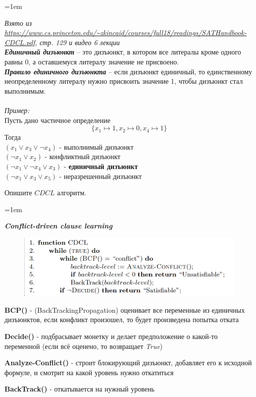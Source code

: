 \documentclass[12pt]{extreport}
\theoremstyle{definiton}
\theoremstyle{definition}
\theoremstyle{definition}
\newcommand{\solution}[2][\color{myblue}Ответ]{
\medskip
	\noindent{\bfseries #1 }{{\color{myblue}\bfseries #2:}}
}
\newenvironment{blockquote}{%
  \par%
  \medskip
  \leftskip=1em%
  \noindent}{%
  \par\medskip}
\begin{document}
\solution{10}
\begin{blockquote}
{\color{myblue}

\textcolor{mypurpur}{\textit{Взято из \url{https://www.cs.princeton.edu/~zkincaid/courses/fall18/readings/SATHandbook-CDCL.pdf}, стр. 129 и видео 6 лекции}}\\

\noindent \textbf{\textit{Единичный дизъюнкт}} -- это дизъюнкт, в котором все литералы кроме одного равны 0, а оставшемуся литералу значение не присвоено. \\
\textbf{\textit{Правило единичного дизъюнкта}}  -- если дизъюнкт единичный, то единственному неопределенному литералу нужно присвоить значение 1, чтобы дизъюнкт стал выполнимым.
\\ \\
 \textit{Пример:} \\
 Пусть дано частичное определение
 \[\{x_1 \mapsto 1, x_2 \mapsto 0, x_4 \mapsto 1\}\]
 Тогда \\ 
 \((x_1 \vee x_3\vee\neg{x_4})\) - выполнимый дизъюнкт \\
\((\neg{x_1} \vee x_2)\) - конфликтный дизъюнкт \\
\((\neg{x_1}\vee\neg{x_4}\vee x_3)\) - \textbf{единичный дизъюнкт} \\
\((\neg{x_1}\vee x_3\vee x_5)\) - неразрешенный дизъюнкт


}



\end{blockquote}

\Pr[\textcolor{mygreen}{Паша, DONE}] Опишите $CDCL$ алгоритм.
			
\solution{11}
\begin{blockquote}
{\color{myblue}
\textbf{\textit{Conflict-driven clause learning}}

\begin{figure}[H]
    \centering
    \includegraphics[width=0.7\linewidth]{images/CDCL.png}
    \label{ris:cdcl}
\end{figure}

\textbf{BCP()} - (BackTrackingPropagation) оценивает все переменные из единичных дизъюнктов, если конфликт произошел, то будет произведена попытка отката

\textbf{Decide()} - подбрасывает монетку и делает предположение о какой-то переменной (если всё оценено, то возвращает \textit{True})

\textbf{Analyze-Conflict()} - строит блокирующий дизъюнкт, добавляет его к исходной формуле, и смотрит на какой уровень нужно откатиться

\textbf{BackTrack()} - откатывается на нужный уровень
}
\end{blockquote}
\end{document}
